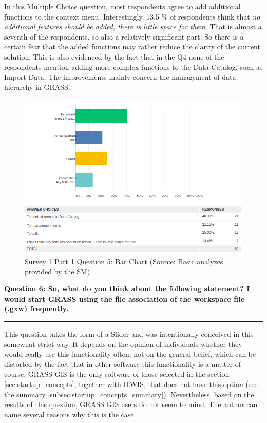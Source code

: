 \documentclass[a4paper,10pt,twoside]{article}
\begin{document}
\noindent In this Multiple Choice question, most respondents agree to add additional functions to the context menu. Interestingly, 13.5 \% of respondents think that \textit{no additional features should be added, there is little space for them}. That is almost a seventh of the respondents, so also a relatively significant part. So there is a certain fear that the added functions may rather reduce the clarity of the current solution. This is also evidenced by the fact that in the Q4 none of the respondents mention adding more complex functions to the Data Catalog, such as Import Data. The improvements mainly concern the management of data hierarchy in GRASS.

\vspace{0.3cm}
\begin{figure}[hbt!] 
\begin{center}
\includegraphics[width=17cm]{../surveys/analyzed_data/survey1_part1_question5_descriptive_stats_sm.png} 
\caption[Survey 1 Part 1 Question 5: Bar Chart]{Survey 1 Part 1 Question 5: Bar Chart (Source: Basic analyzes provided by the SM)}
\label{fig:survey1_part1_question5_descriptive_stats_sm}
\end{center}
\end{figure}

\newpage
\noindent \textbf{Question 6: So, what do you think about the following statement? I would start GRASS using the file association of the workspace file (.gxw) frequently.}
\par\noindent\rule{\textwidth}{0.4pt}

\noindent This question takes the form of a Slider and was intentionally conceived in this somewhat strict way. It depends on the opinion of individuals whether they would really use this functionality often, not on the general belief, which can be distorted by the fact that in other software this functionality is a matter of course. GRASS GIS is the only software of those selected in the section \ref{sec:startup_concepts}, together with ILWIS, that does not have this option (see the summary \ref{subsec:startup_concepts_summary}). Nevertheless, based on the results of this question, GRASS GIS users do not seem to mind. The author can name several reasons why this is the case.
\end{document}
